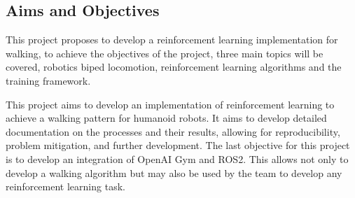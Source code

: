  \subsection{Aims and Objectives}
 This project proposes to develop a reinforcement learning implementation for walking, 
 to achieve the objectives of the project, three main topics will be covered, 
 robotics biped locomotion, reinforcement learning algorithms and the training framework.

 This project aims to develop an implementation of reinforcement learning to achieve a walking pattern for humanoid robots. 
 It aims to develop detailed documentation on the processes and their results, allowing for reproducibility, problem mitigation, and further development.
 The last objective for this project is to develop an integration of OpenAI Gym and ROS2. This allows not only to develop a walking algorithm but may also be used by the team to develop any reinforcement learning task.